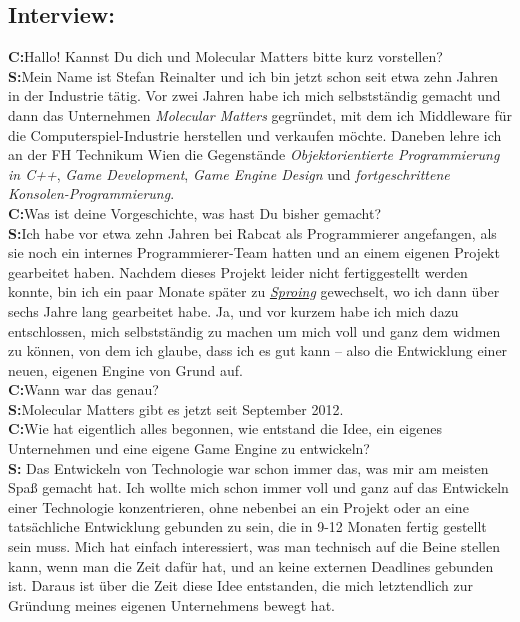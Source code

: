 \documentclass[10pt,a4paper,ngerman,twoside]{article} %
\begin{document}
\begin{multicols}{3}
\subsection*{Interview:}
\textbf{C:}Hallo! Kannst Du dich und Molecular Matters bitte kurz vorstellen? \\
\textbf{S:}Mein Name ist Stefan Reinalter und ich bin jetzt schon seit etwa zehn Jahren in der Industrie tätig. Vor zwei Jahren habe ich mich selbstständig gemacht und dann das Unternehmen \textit{Molecular Matters} gegründet, mit dem ich Middleware für die Computerspiel-Industrie herstellen und verkaufen möchte. Daneben lehre ich an der FH Technikum Wien die Gegenstände \textit{Objektorientierte Programmierung in C++},  \textit{Game Development}, \textit{Game Engine Design} und \textit{fortgeschrittene Konsolen-Programmierung}. \\
\textbf{C:}Was ist deine Vorgeschichte, was hast Du bisher gemacht? \\
\textbf{S:}Ich habe vor etwa zehn Jahren bei Rabcat als Programmierer angefangen, als sie noch ein internes Programmierer-Team hatten und an einem eigenen Projekt gearbeitet haben. Nachdem dieses Projekt leider nicht fertiggestellt werden konnte, bin ich ein paar Monate später zu \href{http://www.sproing.com}{\textit{Sproing}} gewechselt, wo ich dann über sechs Jahre lang gearbeitet habe. Ja, und vor kurzem habe ich mich dazu entschlossen, mich selbstständig zu machen um mich voll und ganz dem widmen zu können, von dem ich glaube, dass ich es gut kann – also die Entwicklung einer neuen, eigenen Engine von Grund auf. \\
\textbf{C:}Wann war das genau? \\
\textbf{S:}Molecular Matters gibt es jetzt seit September 2012. \\
\textbf{C:}Wie hat eigentlich alles begonnen, wie entstand die Idee, ein eigenes Unternehmen und eine eigene Game Engine zu entwickeln? \\
\textbf{S:} Das Entwickeln von Technologie war schon immer das, was mir am meisten Spaß gemacht hat. Ich wollte mich schon immer voll und ganz auf das Entwickeln einer Technologie konzentrieren, ohne nebenbei an ein Projekt oder an eine tatsächliche Entwicklung gebunden zu sein, die in 9-12 Monaten fertig gestellt sein muss. Mich hat einfach interessiert, was man technisch auf die Beine stellen kann, wenn man die Zeit dafür hat, und an keine externen Deadlines gebunden ist. Daraus ist über die Zeit diese Idee entstanden, die mich letztendlich zur Gründung meines eigenen Unternehmens bewegt hat. \\

\end{multicols}
\end{document}
